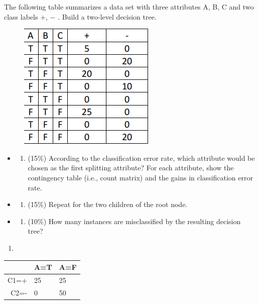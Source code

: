 \documentclass[11pt]{article}
\makeatletter
\def\maxwidth{\ifdim\Gin@nat@width>\linewidth\linewidth
    \else\Gin@nat@width\fi}
\let\Oldincludegraphics\includegraphics
\renewcommand{\includegraphics}[1]{\Oldincludegraphics[width=.8\maxwidth]{#1}}
\providecommand{\tightlist}{%
      \setlength{\itemsep}{0pt}\setlength{\parskip}{0pt}}
\makeatother
\begin{document}
    The following table summarizes a data set with three attributes A, B, C
and two class labels +, − . Build a two-level decision tree.

\begin{figure}[H]
\centering
\includegraphics{3.png}
\caption{}
\end{figure}

\begin{itemize}
\item
  \begin{enumerate}
  \def\labelenumi{\alph{enumi}.}
  \tightlist
  \item
    (15\%) According to the classification error rate, which attribute
    would be chosen as the first splitting attribute? For each
    attribute, show the contingency table (i.e., count matrix) and the
    gains in classification error rate.
  \end{enumerate}
\item
  \begin{enumerate}
  \def\labelenumi{\alph{enumi}.}
  \setcounter{enumi}{1}
  \tightlist
  \item
    (15\%) Repeat for the two children of the root node.
  \end{enumerate}
\item
  \begin{enumerate}
  \def\labelenumi{\alph{enumi}.}
  \setcounter{enumi}{2}
  \tightlist
  \item
    (10\%) How many instances are misclassified by the resulting
    decision tree?
  \end{enumerate}
\end{itemize}

    \begin{enumerate}
\def\labelenumi{(\alph{enumi})}
\item
\end{enumerate}

\begin{table}[H]
	\centering
\begin{tabular}{|r|l|l|}
  & A=T & A=F \\
\hline
     C1=+ &  25     & 25 \\
     C2=-   &  0    & 50 \\
\end{tabular}
\end{table}
\end{document}
